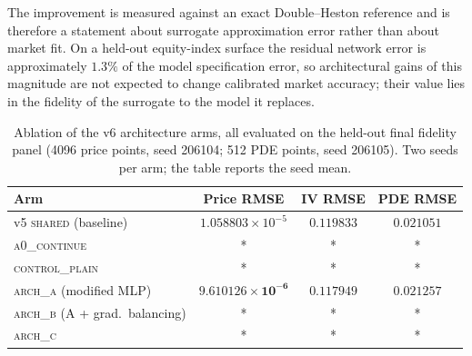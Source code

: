 %


The improvement is measured against an exact Double--Heston reference and is
therefore a statement about surrogate approximation error rather than about
market fit. On a held-out equity-index surface the residual network error is
approximately $1.3\%$ of the model specification error, so architectural gains
of this magnitude are not expected to change calibrated market accuracy; their
value lies in the fidelity of the surrogate to the model it replaces.


\begin{table}[t]
\centering
\caption{Ablation of the v6 architecture arms, all evaluated on the held-out
final fidelity panel (4096 price points, seed 206104; 512 PDE points, seed
206105). Two seeds per arm; the table reports the seed mean.}
\label{tab:ablation}
\begin{tabular}{lccc}
\toprule
Arm & Price RMSE & IV RMSE & PDE RMSE \\
\midrule
v5 \textsc{shared} (baseline) & $1.058803\times10^{-5}$ & $0.119833$ & $0.021051$ \\
\textsc{a0\_continue}         & *                       & *          & *          \\
\textsc{control\_plain}       & *                       & *          & *          \\
\textsc{arch\_a} (modified MLP) & $\mathbf{9.610126\times10^{-6}}$ & $\mathbf{0.117949}$ & $0.021257$ \\
\textsc{arch\_b} (A + grad.\ balancing) & *              & *          & *          \\
\textsc{arch\_c}              & *                       & *          & *          \\
\bottomrule
\end{tabular}
\end{table}


